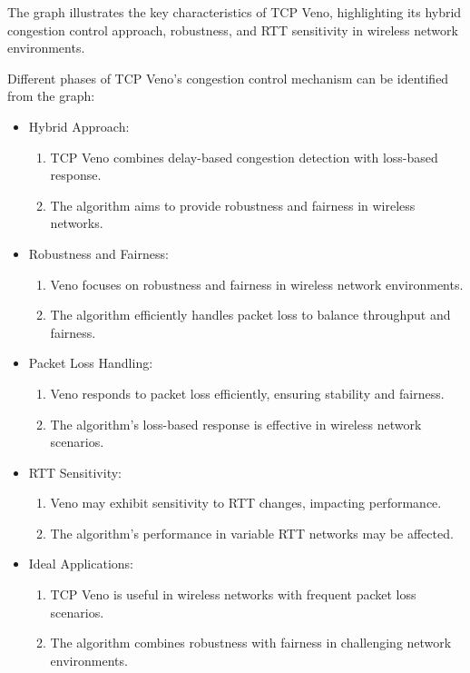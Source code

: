 \documentclass[11pt,a4paper]{article}
\begin{document}
The graph illustrates the key characteristics of TCP Veno, highlighting its hybrid congestion control approach, robustness, and RTT sensitivity in wireless network environments.

Different phases of TCP Veno's congestion control mechanism can be identified from the graph:

\begin{itemize}
    \item Hybrid Approach: {
        \begin{enumerate}
            \item TCP Veno combines delay-based congestion detection with loss-based response.
            \item The algorithm aims to provide robustness and fairness in wireless networks.
        \end{enumerate}
    }
    \item Robustness and Fairness: {
        \begin{enumerate}
            \item Veno focuses on robustness and fairness in wireless network environments.
            \item The algorithm efficiently handles packet loss to balance throughput and fairness.
        \end{enumerate}
    }
    \item Packet Loss Handling: {
        \begin{enumerate}
            \item Veno responds to packet loss efficiently, ensuring stability and fairness.
            \item The algorithm's loss-based response is effective in wireless network scenarios.
        \end{enumerate}
    }
    \item RTT Sensitivity: {
        \begin{enumerate}
            \item Veno may exhibit sensitivity to RTT changes, impacting performance.
            \item The algorithm's performance in variable RTT networks may be affected.
        \end{enumerate}
    }
    \item Ideal Applications: {
        \begin{enumerate}
            \item TCP Veno is useful in wireless networks with frequent packet loss scenarios.
            \item The algorithm combines robustness with fairness in challenging network environments.
        \end{enumerate}
    }
\end{itemize}
\end{document}
